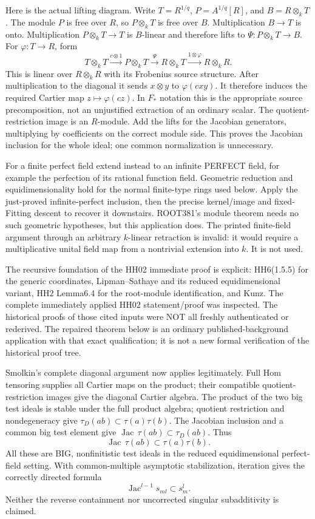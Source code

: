 \documentclass[11pt]{article}
\begin{document}
Here is the actual lifting diagram. Write \(T=R^{1/q}\), \(P=A^{1/q}[R]\), and \(B=R\otimes_k T\). The module \(P\) is free over \(R\), so \(P\otimes_kT\) is free over \(B\). Multiplication \(B\to T\) is onto. Multiplication \(P\otimes_kT\to T\) is \(B\)-linear and therefore lifts to \(\Psi:P\otimes_kT\to B\). For \(\varphi:T\to R\), form
\[
T\otimes_kT\xrightarrow{c\otimes1}P\otimes_kT
 \xrightarrow{\Psi}R\otimes_kT
 \xrightarrow{1\otimes\varphi}R\otimes_kR.
\]
This is linear over \(R\otimes_kR\) with its Frobenius source structure. After multiplication to the diagonal it sends \(x\otimes y\) to \(\varphi(cxy)\). It therefore induces the required Cartier map \(z\mapsto\varphi(cz)\). In \(F_*\) notation this is the appropriate source precomposition, not an unjustified extraction of an ordinary scalar. The quotient-restriction image is an \(R\)-module. Add the lifts for the Jacobian generators, multiplying by coefficients on the correct module side. This proves the Jacobian inclusion for the whole ideal; one common normalization is unnecessary.

For a finite perfect field extend instead to an infinite PERFECT field, for example the perfection of its rational function field. Geometric reduction and equidimensionality hold for the normal finite-type rings used below. Apply the just-proved infinite-perfect inclusion, then the precise kernel/image and fixed-Fitting descent to recover it downstairs. ROOT381's module theorem needs no such geometric hypotheses, but this application does. The printed finite-field argument through an arbitrary \(k\)-linear retraction is invalid: it would require a multiplicative unital field map from a nontrivial extension into \(k\). It is not used.

The recursive foundation of the HH02 immediate proof is explicit: HH6(1.5.5) for the generic coordinates, Lipman--Sathaye and its reduced equidimensional variant, HH2 Lemma6.4 for the root-module identification, and Kunz. The complete immediately applied HH02 statement/proof was inspected. The historical proofs of those cited inputs were NOT all freshly authenticated or rederived. The repaired theorem below is an ordinary published-background application with that exact qualification; it is not a new formal verification of the historical proof tree.

Smolkin's complete diagonal argument now applies legitimately. Full Hom tensoring supplies all Cartier maps on the product; their compatible quotient-restriction images give the diagonal Cartier algebra. The product of the two big test ideals is stable under the full product algebra; quotient restriction and nondegeneracy give \(\tau_D(ab)\subset\tau(a)\tau(b)\). The Jacobian inclusion and a common big test element give \(\operatorname{Jac}\,\tau(ab)\subset\tau_D(ab)\). Thus
\[
\operatorname{Jac}\,\tau(ab)\subset\tau(a)\tau(b).
\]
All these are BIG, nonfinitistic test ideals in the reduced equidimensional perfect-field setting. With common-multiple asymptotic stabilization, iteration gives the correctly directed formula
\[
\operatorname{Jac}^{l-1}s_{ml}\subset s_m^l.
\]
Neither the reverse containment nor uncorrected singular subadditivity is claimed.
\end{document}
